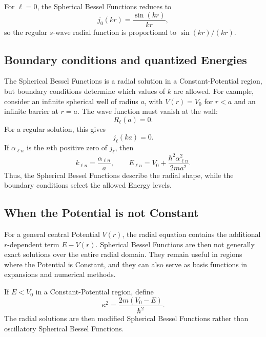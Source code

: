 \documentclass[a4paper, 10pt, onepage]{elegantbook}
\begin{document}
{For $\ell=0$, the Spherical Bessel Functions reduces to
\begin{equation}
  j_0(kr)=\frac{\sin(kr)}{kr},
\end{equation}
so the regular $s$-wave radial function is proportional to
$\sin(kr)/(kr)$.

\subsection{Boundary conditions and quantized Energies}

\noindent

The Spherical Bessel Functions is a radial solution in a
Constant-Potential region, but boundary conditions determine which
values of $k$ are allowed. For example, consider an infinite spherical
well of radius $a$, with $V(r)=V_0$ for $r<a$ and an infinite barrier
at $r=a$. The wave function must vanish at the wall:
\begin{equation}
  R_\ell(a)=0.
\end{equation}
For a regular solution, this gives
\begin{equation}
  j_\ell(ka)=0.
\end{equation}
If $\alpha_{\ell n}$ is the $n$th positive zero of $j_\ell$, then
\begin{equation}
  k_{\ell n}=\frac{\alpha_{\ell n}}{a},
  \qquad
  E_{\ell n}=V_0+\frac{\hbar^2\alpha_{\ell n}^2}{2ma^2}.
\end{equation}
Thus, the Spherical Bessel Functions describe the radial shape, while
the boundary conditions select the allowed Energy levels.

\subsection{When the Potential is not Constant}

\noindent

For a general central Potential $V(r)$, the radial equation contains
the additional $r$-dependent term $E-V(r)$. Spherical Bessel Functions
are then not generally exact solutions over the entire radial
domain. They remain useful in regions where the Potential is
Constant, and they can also serve as basis functions in expansions
and numerical methods.

If $E<V_0$ in a Constant-Potential region, define
\begin{equation}
  \kappa^2=\frac{2m(V_0-E)}{\hbar^2}.
\end{equation}
The radial solutions are then modified Spherical Bessel Functions
rather than oscillatory Spherical Bessel Functions.

}
\end{document}

